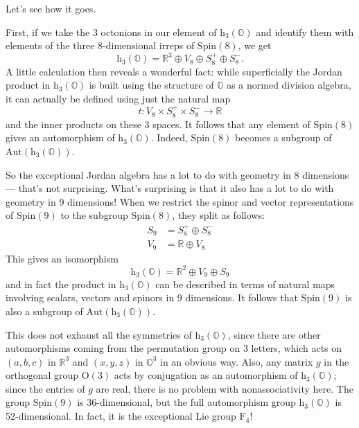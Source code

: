 \documentclass{article}
\begin{document}
Let's see how it goes.

First, if we take the 3 octonions in our element of
\(\mathrm{h}_3(\mathbb{O})\) and identify them with elements of the
three \(8\)-dimensional irreps of \(\mathrm{Spin}(8)\), we get
\[\mathrm{h}_3(\mathbb{O}) = \mathbb{R}^3\oplus V_8\oplus S_8^+\oplus S_8^-.\]
A little calculation then reveals a wonderful fact: while superficially
the Jordan product in \(\mathrm{h}_3(\mathbb{O})\) is built using the
structure of \(\mathbb{O}\) as a normed division algebra, it can
actually be defined using just the natural map
\[t\colon V_8\times S_8^+\times S_8^-\to\mathbb{R}\] and the inner
products on these 3 spaces. It follows that any element of
\(\mathrm{Spin}(8)\) gives an automorphism of
\(\mathrm{h}_3(\mathbb{O})\). Indeed, \(\mathrm{Spin}(8)\) becomes a
subgroup of \(\mathrm{Aut}(\mathrm{h}_3(\mathbb{O}))\).

So the exceptional Jordan algebra has a lot to do with geometry in 8
dimensions --- that's not surprising. What's surprising is that it also
has a lot to do with geometry in 9 dimensions! When we restrict the
spinor and vector representations of \(\mathrm{Spin}(9)\) to the
subgroup \(\mathrm{Spin}(8)\), they split as follows: \[
  \begin{aligned}
    S_9 &= S_8^+\oplus S_8^-
  \\V_9 &= \mathbb{R}\oplus V_8
  \end{aligned}
\] This gives an isomorphism
\[\mathrm{h}_3(\mathbb{O}) = \mathbb{R}^2\oplus V_9\oplus S_9\] and in
fact the product in \(\mathrm{h}_3(\mathbb{O})\) can be described in
terms of natural maps involving scalars, vectors and spinors in 9
dimensions. It follows that \(\mathrm{Spin}(9)\) is also a subgroup of
\(\mathrm{Aut}(\mathrm{h}_3(\mathbb{O}))\).

This does not exhaust all the symmetries of
\(\mathrm{h}_3(\mathbb{O})\), since there are other automorphisms coming
from the permutation group on 3 letters, which acts on \((a,b,c)\) in
\(\mathbb{R}^3\) and \((x,y,z)\) in \(\mathbb{O}^3\) in an obvious way.
Also, any matrix \(g\) in the orthogonal group \(\mathrm{O}(3)\) acts by
conjugation as an automorphism of \(\mathrm{h}_3(\mathbb{O})\); since
the entries of \(g\) are real, there is no problem with nonassociativity
here. The group \(\mathrm{Spin}(9)\) is 36-dimensional, but the full
automorphism group \(\mathrm{h}_3(\mathbb{O})\) is 52-dimensional. In
fact, it is the exceptional Lie group \(\mathrm{F}_4\)!
\end{document}
